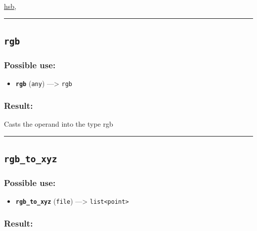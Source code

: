 \documentclass[]{book}
\providecommand{\tightlist}{%
  \setlength{\itemsep}{0pt}\setlength{\parskip}{0pt}}
\theoremstyle{definition}
\theoremstyle{definition}
\theoremstyle{definition}
\theoremstyle{remark}
\begin{document}
\href{operators-d-to-h.html\#hsb}{hsb},

\begin{center}\rule{0.5\linewidth}{\linethickness}\end{center}

\subsection{\texorpdfstring{\texttt{rgb}}{rgb}}\label{rgb-1}

\subsubsection{Possible use:}\label{possible-use-438}

\begin{itemize}
\tightlist
\item
  \textbf{\texttt{rgb}} (\texttt{any}) ---\textgreater{} \texttt{rgb}
\end{itemize}

\subsubsection{Result:}\label{result-424}

Casts the operand into the type rgb

\begin{center}\rule{0.5\linewidth}{\linethickness}\end{center}

\subsection{\texorpdfstring{\texttt{rgb\_to\_xyz}}{rgb\_to\_xyz}}\label{rgb_to_xyz}

\subsubsection{Possible use:}\label{possible-use-439}

\begin{itemize}
\tightlist
\item
  \textbf{\texttt{rgb\_to\_xyz}} (\texttt{file}) ---\textgreater{}
  \texttt{list\textless{}point\textgreater{}}
\end{itemize}

\subsubsection{Result:}\label{result-425}
\end{document}
